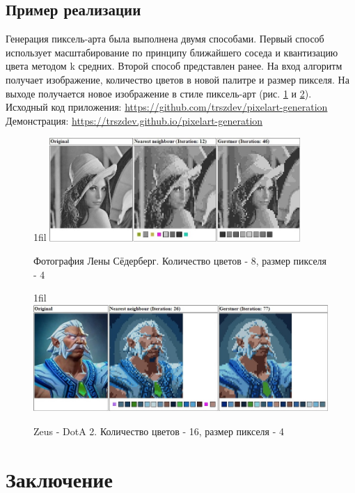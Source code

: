 \documentclass[a4paper,12pt]{report}
\makeatletter
\newcommand*{\centerfloat}{%
  \parindent \z@
  \leftskip \z@ \@plus 1fil \@minus \textwidth
  \rightskip\leftskip
  \parfillskip \z@skip}
\makeatother
\begin{document}
\section{Пример реализации}

Генерация пиксель-арта была выполнена двумя способами. Первый способ использует масштабирование по принципу ближайшего соседа и квантизацию цвета методом k средних. Второй способ представлен ранее. На вход алгоритм получает изображение, количество цветов в новой палитре и размер пикселя. На выходе получается новое изображение в стиле пиксель-арт (рис. \ref{fig:pixel-impl} и \ref{fig:pixel-impl2}).
\newline
\newline
Исходный код приложения: \url{https://github.com/trszdev/pixelart-generation}
\newline
Демонстрация: \url{https://trszdev.github.io/pixelart-generation}

\begin{figure}
    \centerfloat
    \includegraphics[width=0.85\textwidth]{pixel/2.jpg}
    \caption{Фотография Лены Сёдерберг. Количество цветов - 8, размер пикселя - 4}
    \label{fig:pixel-impl}
\end{figure}

\begin{figure}
    \centerfloat
    \includegraphics[width=1\textwidth]{pixel/3.jpg}
    \caption{Zeus - DotA 2. Количество цветов - 16, размер пикселя - 4}
    \label{fig:pixel-impl2}
\end{figure}

\chapter{Заключение}
\end{document}
